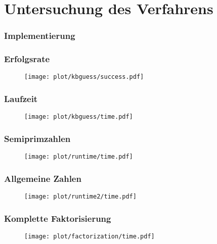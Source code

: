 \section{Untersuchung des Verfahrens}
\begin{frame}
  \frametitle{Implementierung}
\end{frame}

\begin{frame}
  \frametitle{Erfolgsrate}
  \begin{figure}[H]
    \centering
    \texttt{[image: plot/kbguess/success.pdf]}
  \end{figure}
\end{frame}
\begin{frame}
  \frametitle{Laufzeit}
  \begin{figure}[H]
    \centering
    \texttt{[image: plot/kbguess/time.pdf]}
  \end{figure}
\end{frame}

\begin{frame}
  \frametitle{Semiprimzahlen}
  \begin{figure}[H]
    \centering
    \texttt{[image: plot/runtime/time.pdf]}
  \end{figure}
\end{frame}
\begin{frame}
  \frametitle{Allgemeine Zahlen}
  \begin{figure}[H]
    \centering
    \texttt{[image: plot/runtime2/time.pdf]}
  \end{figure}
\end{frame}

\begin{frame}
  \frametitle{Komplette Faktorisierung}
  \begin{figure}[H]
    \centering
    \texttt{[image: plot/factorization/time.pdf]}
  \end{figure}
\end{frame}
